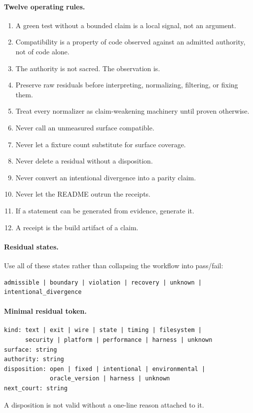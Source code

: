 \documentclass[11pt,a4paper]{article}
\begin{document}
\clearpage
\paragraph{Twelve operating rules.}
\begin{enumerate}
\item A green test without a bounded claim is a local signal, not an argument.
\item Compatibility is a property of code observed against an admitted authority, not of code alone.
\item The authority is not sacred. The observation is.
\item Preserve raw residuals before interpreting, normalizing, filtering, or fixing them.
\item Treat every normalizer as claim-weakening machinery until proven otherwise.
\item Never call an unmeasured surface compatible.
\item Never let a fixture count substitute for surface coverage.
\item Never delete a residual without a disposition.
\item Never convert an intentional divergence into a parity claim.
\item Never let the README outrun the receipts.
\item If a statement can be generated from evidence, generate it.
\item A receipt is the build artifact of a claim.
\end{enumerate}

\paragraph{Residual states.}
Use all of these states rather than collapsing the workflow into pass/fail:
\begin{verbatim}
admissible | boundary | violation | recovery | unknown |
intentional_divergence
\end{verbatim}

\paragraph{Minimal residual token.}
\begin{verbatim}
kind: text | exit | wire | state | timing | filesystem |
      security | platform | performance | harness | unknown
surface: string
authority: string
disposition: open | fixed | intentional | environmental |
             oracle_version | harness | unknown
next_court: string
\end{verbatim}
A disposition is not valid without a one-line reason attached to it.
\end{document}
